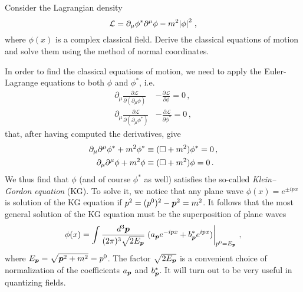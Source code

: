 \begin{ex} \label{Ex2} 
    Consider the Lagrangian density
    \begin{equation}
        \mathcal{L} = \partial_\mu \phi^* \partial^\mu \phi - m^2 \abs{\phi}^2 \; ,
    \end{equation}
    where $\phi(x)$ is a complex classical field. Derive the classical equations of motion and solve them using the method of normal coordinates.
\end{ex}


\begin{sol}
    In order to find the classical equations of motion, we need to apply the Euler-Lagrange equations to both $\phi$ and $\phi^{*}$, i.e.
    \begin{equation}
    \begin{split}
        \partial_{\mu}\frac{\partial \mathcal{L}}{\partial(\partial_{\mu}\phi)} &- \frac{\partial \mathcal{L}}{\partial \phi} =  0 \, ,\\
        \partial_{\mu}\frac{\partial \mathcal{L}}{\partial(\partial_{\mu}\phi^{*})} &- \frac{\partial \mathcal{L}}{\partial \phi^{*}} =  0 \, ,
    \end{split}
    \end{equation}
    that, after having computed the derivatives, give
    \begin{equation}
    \begin{split}
        \partial_{\mu}\partial^{\mu} \phi^{*} + m^{2}\phi^{*} &\equiv (\square + m^{2}) \phi^{*} = 0 \, , \\ 
        \partial_{\mu}\partial^{\mu} \phi + m^{2}\phi &\equiv (\square + m^{2}) \phi = 0 \, .
    \end{split}
    \end{equation}
    We thus find that $\phi$ (and of course $\phi^*$ as well) satisfies the so-called \emph{Klein–Gordon equation} (KG).
    To solve it, we notice that any plane wave $\phi(x) = e^{\pm ipx}$ is solution of the KG equation if $p^2 = (p^{0})^{2} - \boldsymbol{p}^2 = m^2$. It follows that the most general solution of the KG equation must be the superposition of plane waves 
    \begin{equation}
        \phi(x) = \int \frac{d^{3} \vp}{(2\pi)^{3} \sqrt{2 \Ep}} \eval{(a_{\vp} e^{- ipx} + b_{\vp}^* e^{ipx})}_{p^{0} = \Ep} \, ,
    \end{equation}
    where $E_{\boldsymbol{p}} = \sqrt{\boldsymbol{p}^2 + m^2} = p^0$. The factor $\sqrt{2 E_{\boldsymbol{p}}}$ is a convenient choice of normalization of the coefficients $a_{\boldsymbol{p}}$ and $b_{\boldsymbol{p}}^*$. It will turn out to be very useful in quantizing fields.


\end{sol}
